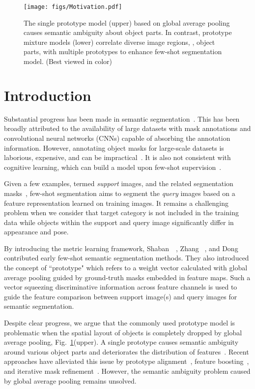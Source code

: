 \documentclass[runningheads]{llncs}
\begin{document}
\begin{figure}[t]
\centering
\texttt{[image: figs/Motivation.pdf]}
\caption{The single prototype model (upper) based on global average pooling causes semantic ambiguity about object parts. In contrast, prototype mixture models (lower) correlate diverse image regions, , object parts, with multiple prototypes to enhance few-shot segmentation model.  (Best viewed in color)}
\label{fig:motivation}
\vspace{-0.2cm}
\end{figure}

\section{Introduction}

Substantial progress has been made in semantic segmentation~\cite{PSPNet,UNet,DeepLabV1,DeepLabV2,DeepLabV3,DeepLabV3+,SegSort,MaskRCNN-PAMI2020,EMA}. This has been broadly attributed to the availability of large datasets with mask annotations and convolutional neural networks (CNNs) capable of absorbing the annotation information. However, annotating object masks for large-scale datasets is laborious, expensive, and can be impractical~\cite{CMIL2019,MinEntropy2019,FreeAnchor2019}. It is also not consistent with cognitive learning, which can build a model upon few-shot supervision~\cite{CompositionalRepre-ICCV2019}.


Given a few examples, termed \textit{support} images, and the related segmentation masks~\cite{FWB-ICCV2019}, few-shot segmentation aims to segment the \textit{query} images based on a feature representation learned on training images. It remains a challenging problem when we consider that target category is not included in the training data while objects within the support and query image significantly differ in appearance and pose.

By introducing the metric learning framework, Shaban~\etal~\cite{OSLSM}, Zhang \etal~\cite{SG-One}, and Dong \etal~\cite{BMVC18Prototype} contributed early few-shot semantic segmentation methods. They also introduced the concept of ``prototype" which refers to a weight vector calculated with global average pooling guided by ground-truth masks embedded in feature maps. Such a vector squeezing discriminative information across feature channels is used to guide the feature comparison between support image(s) and query images for semantic segmentation. 

Despite clear progress, we argue that the commonly used prototype model is problematic when the spatial layout of objects is completely dropped by global average pooling, Fig.\ \ref{fig:motivation}(upper). A single prototype causes semantic ambiguity around various object parts and deteriorates the distribution of features~\cite{CollectSelect19}. Recent approaches have alleviated this issue by prototype alignment~\cite{PANet}, feature boosting~\cite{FWB-ICCV2019}, and iterative mask refinement~\cite{CaNet}. However, the semantic ambiguity problem caused by global average pooling remains unsolved.
\end{document}
